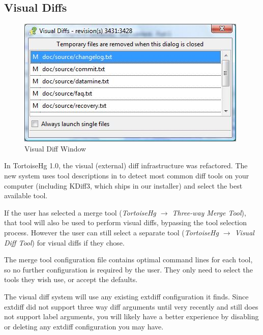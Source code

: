 \documentclass[letterpaper,10pt,english]{manual}
\begin{document}
\subsection{Visual Diffs}
\begin{figure}[htbp]
\centering

\includegraphics{visual-diff.jpg}
\caption{Visual Diff Window}\end{figure}

In TortoiseHg 1.0, the visual (external) diff infrastructure was
refactored.  The new system uses tool descriptions in
 to detect most common diff tools on your computer
(including KDiff3, which ships in our installer) and select the best
available tool.

If the user has selected a merge tool
(\emph{TortoiseHg \(\rightarrow\) Three-way Merge Tool}), that tool will
also be used to perform visual diffs, bypassing the tool selection
process.  However the user can still select a separate tool
(\emph{TortoiseHg \(\rightarrow\) Visual Diff Tool}) for visual diffs if
they chose.

The merge tool configuration file contains optimal command lines for
each tool, so no further configuration is required by the user.  They
only need to select the tools they wish use, or accept the defaults.

The visual diff system will use any existing extdiff configuration it
finds.  Since extdiff did not support three way diff arguments until
very recently and still does not support label arguments, you will
likely have a better experience by disabling or deleting any extdiff
configuration you may have.
\end{document}
